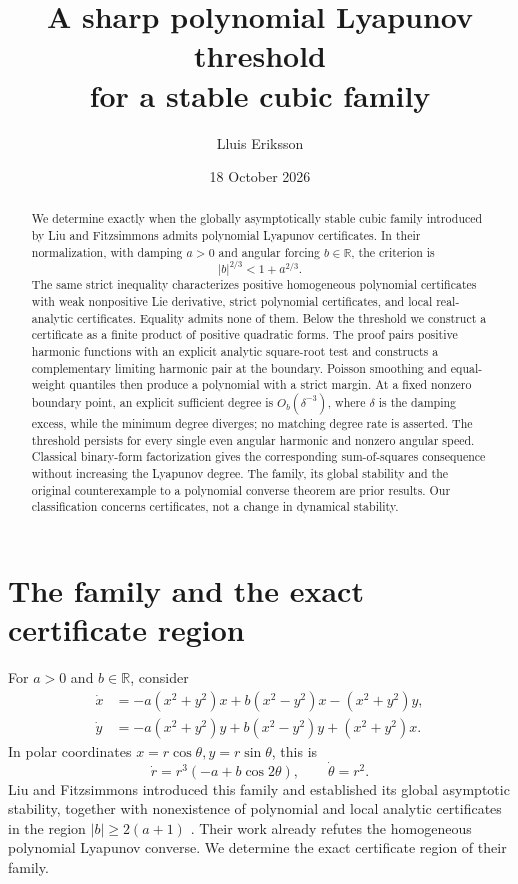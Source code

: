 \documentclass[11pt]{article}
\title{A sharp polynomial Lyapunov threshold\\for a stable cubic family}
\author{Lluis Eriksson}
\date{18 October 2026}
\theoremstyle{remark}\newtheorem{remark}[theorem]{Remark}
\newcommand{\R}{\mathbb R}
\begin{document}
\maketitle
\begin{abstract}
We determine exactly when the globally asymptotically stable cubic
family introduced by Liu and Fitzsimmons admits polynomial Lyapunov
certificates. In their normalization, with damping \(a>0\) and angular
forcing \(b\in\R\), the criterion is
\[
 |b|^{2/3}<1+a^{2/3}.
\]
The same strict inequality characterizes positive homogeneous
polynomial certificates with weak nonpositive Lie derivative, strict
polynomial certificates, and local real-analytic certificates.
Equality admits none of them. Below the threshold we construct a
certificate as a finite product of positive quadratic forms.
The proof pairs positive harmonic functions with an explicit analytic
square-root test and constructs a complementary limiting harmonic
pair at the boundary. Poisson smoothing and equal-weight quantiles
then produce a polynomial with a strict margin.
At a fixed nonzero boundary point, an explicit sufficient degree is
\(O_b(\delta^{-3})\), where \(\delta\) is the damping excess, while
the minimum degree diverges; no matching degree rate is asserted.
The threshold persists for every single even angular harmonic and
nonzero angular speed. Classical binary-form factorization gives
the corresponding sum-of-squares consequence without increasing the
Lyapunov degree. The family, its global stability and the original
counterexample to a polynomial converse theorem are prior results.
Our classification concerns certificates, not a change in dynamical
stability.
\end{abstract}

\section{The family and the exact certificate region}
For \(a>0\) and \(b\in\R\), consider
\begin{equation}\label{eq:field}
 \begin{aligned}
 \dot x&=-a(x^2+y^2)x+b(x^2-y^2)x-(x^2+y^2)y,\\
 \dot y&=-a(x^2+y^2)y+b(x^2-y^2)y+(x^2+y^2)x .
 \end{aligned}
\end{equation}
In polar coordinates \(x=r\cos\theta,y=r\sin\theta\), this is
\begin{equation}\label{eq:polar}
 \dot r=r^3(-a+b\cos2\theta),\qquad \dot\theta=r^2 .
\end{equation}
Liu and Fitzsimmons introduced this family and established its
global asymptotic stability, together with nonexistence of polynomial
and local analytic certificates in the region
\(|b|\ge2(a+1)\) \cite{liu}. Their work already refutes the homogeneous
polynomial Lyapunov converse. We determine the exact certificate
region of their family.
\end{document}
